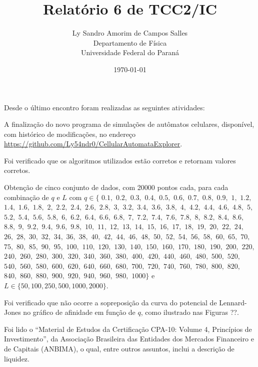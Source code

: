\documentclass[12pt,a4paper,final]{article}
\title{Relatório 6 de TCC2/IC}
\author{Ly Sandro Amorim de Campos Salles\\Departamento de Física\\Universidade Federal do Paraná}
\date{\today}
\begin{document}
	\maketitle

  Desde o último encontro foram realizadas as seguintes atividades:

  A finalização do novo programa de simulações de autômatos celulares, disponível, com histórico de modificações, no endereço \url{https://github.com/Ly54ndr0/CellularAutomataExplorer}.

  Foi verificado que os algoritmos utilizados estão corretos e retornam valores corretos.

  Obtenção de cinco conjunto de dados, com 20000 pontos cada, para cada combinação de $q$ e $L$ com $q\in\{$ 
  $0.1,$ $0.2,$ $0.3,$ $0.4,$ $0.5,$ $0.6,$ $0.7,$ $0.8,$ $0.9,$
  $1,$ $1.2,$ $1.4,$ $1.6,$ $1.8,$ 
  $2,$ $2.2,$ $2.4,$ $2.6,$ $2.8,$ 
  $3,$ $3.2,$ $3.4,$ $3.6,$ $3.8,$
  $4,$ $4.2,$ $4.4,$ $4.6,$ $4.8,$
  $5,$ $5.2,$ $5.4,$ $5.6,$ $5.8,$
  $6,$ $6.2,$ $6.4,$ $6.6,$ $6.8,$
  $7,$ $7.2,$ $7.4,$ $7.6,$ $7.8,$
  $8,$ $8.2,$ $8.4,$ $8.6,$ $8.8,$
  $9,$ $9.2,$ $9.4,$ $9.6,$ $9.8,$ $10,$
  $11,$ $12,$ $13,$ $14,$ $15,$ $16,$ $17,$ $18,$ $19,$ $20,$
  $22,$ $24,$ $26,$ $28,$ $30,$ $32,$ $34,$ $36,$ $38,$ $40,$
  $42,$ $44,$ $46,$ $48,$ $50,$ $52,$ $54,$ $56,$ $58,$ $60,$
  $65,$ $70,$ $75,$ $80,$ $85,$ $90,$ $95,$ $100,$ $110,$
  $120,$ $130,$ $140,$ $150,$ $160,$ $170,$ $180,$ $190,$
  $200,$ $220,$ $240,$ $260,$ $280,$ $300,$ $320,$ $340,$ $360,$ $380,$
  $400,$ $420,$ $440,$ $460,$ $480,$ $500,$ $520,$ $540,$ $560,$ $580,$
  $600,$ $620,$ $640,$ $660,$ $680,$ $700,$ $720,$ $740,$ $760,$ $780,$
  $800,$ $820,$ $840,$ $860,$ $880,$ $900,$ $920,$ $940,$ $960,$ $980,$
  $1000\}$ e $L\in \{50, 100, 250, 500, 1000, 2000\}$.

  Foi verificado que não ocorre a sopreposição da curva do potencial de Lennard-Jones no gráfico de afinidade em função de $q$, como ilustrado nas Figuras ??.


  Foi lido o ``Material de Estudos da Certificação CPA-10: Volume 4, Princípios de Investimento'', da Associação Brasileira das Entidades dos Mercados Financeiro e de Capitais (ANBIMA), o qual, entre outros assuntos, inclui a descrição de liquidez.
  
\end{document}
